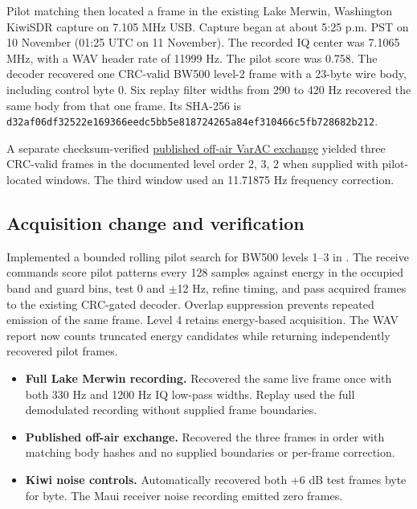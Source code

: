 \documentclass[11pt,a4paper]{article}
\newcommand{\pathtext}[1]{\path{#1}}
\newcommand{\hashtext}[4]{\texttt{\small #1\allowbreak{}#2\allowbreak{}#3\allowbreak{}#4}}
\begin{document}
Pilot matching then located a frame in the existing Lake Merwin,
Washington KiwiSDR capture on 7.105 MHz USB. Capture began at about
5:25 p.m. PST on 10 November (01:25 UTC on 11 November). The recorded
IQ center was 7.1065 MHz, with a WAV header rate of 11999 Hz. The pilot
score was 0.758. The decoder recovered one CRC-valid BW500 level-2
frame with a 23-byte wire body, including control byte 0. Six replay
filter widths from 290 to 420 Hz recovered the same body from that
one frame. Its SHA-256 is
\hashtext{d32af06df32522e1}{69366eedc5bb5e81}{8724265a84ef3104}{66c5fb728682b212}.

A separate checksum-verified \href{https://github.com/sstjohn/hfmodem/tree/952f79245240132f4af209afbad1f4b2ba256613/packages/hfmodem/hfmodem/tests/contact/fixtures/varac-observed-pairs-1025}{published off-air VarAC exchange}
yielded three CRC-valid frames in the documented level order 2, 3, 2
when supplied with pilot-located windows. The third window used an
11.71875 Hz frequency correction.

\subsection{Acquisition change and verification}

Implemented a bounded rolling pilot search for BW500 levels 1--3 in
\pathtext{rust/src/modem/bw500/scan.rs}. The receive commands score
pilot patterns every 128 samples against energy in the occupied band
and guard bins, test 0 and $\pm$12 Hz, refine timing, and pass acquired
frames to the existing CRC-gated decoder. Overlap suppression prevents
repeated emission of the same frame. Level 4 retains energy-based
acquisition. The WAV report now counts truncated energy candidates
while returning independently recovered pilot frames.

\begin{itemize}[leftmargin=*]
  \item \textbf{Full Lake Merwin recording.} Recovered the same live
        frame once with both 330 Hz and 1200 Hz IQ low-pass widths.
        Replay used the full demodulated recording without supplied
        frame boundaries.
  \item \textbf{Published off-air exchange.} Recovered the three frames
        in order with matching body hashes and no supplied boundaries
        or per-frame correction.
  \item \textbf{Kiwi noise controls.} Automatically recovered both +6 dB
        test frames byte for byte. The Maui receiver noise recording
        emitted zero frames.
\end{itemize}
\end{document}
